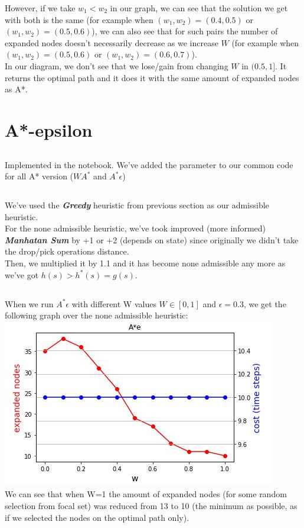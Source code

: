 \documentclass[12pt]{article}
\begin{document}
However, if we take $w_1<w_2$ in our graph, we can see that the solution we get with both is the same (for example when $(w_1,w_2)=(0.4,0.5)$ or $(w_1,w_2)=(0.5,0.6)$), we can also see that for such pairs the number of expanded nodes doesn't necessarily decrease as we increase $W$ (for example when $(w_1,w_2)=(0.5,0.6)$ or $(w_1,w_2)=(0.6,0.7)$).\\

In our diagram, we don't see that we lose/gain from changing $W$ in $(0.5,1]$. It returns the optimal path and it does it with the same amount of expanded nodes as A*.

\section{A*-epsilon}
\subsection{}
Implemented in the notebook. We've added the parameter to our common code for all A* version ($WA^*$ and $A^*\epsilon$)

\subsection{}
We've used the {\textit{\textbf{Greedy}}} heuristic from previous section as our admissible heuristic.\\
For the none admissible heuristic, we've took improved (more informed) {\textit{\textbf{Manhatan Sum}}} by +1 or +2 (depends on state) since originally we didn't take the drop/pick operations distance.\\
Then, we multiplied it by 1.1 and it has become none admissible any more as we've got  $h(s) > h^*(s) = g(s)$.

\subsection{}

When we run $A^*\epsilon$ with different W values $W\in[0,1]$ and $\epsilon = 0.3$, we get the following graph over the none admissible heuristic:\\
\includegraphics[scale=1]{hw1/w_graph_more_accurate.JPG}\\

We can see that when W=1 the amount of expanded nodes (for some random selection from focal set) was reduced from 13 to 10 (the minimum as possible, as if we selected the nodes on the optimal path only).
\end{document}
